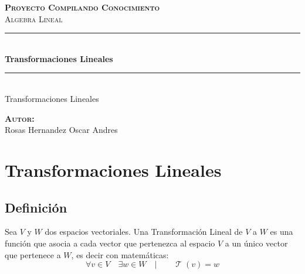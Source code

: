 \documentclass[12pt]{report}                                    %
\author{Oscar Andrés Rosas}                                     %
\DeclareMathOperator \LinealTransformation {\mathcal{T}}        %
\begin{document}
\begin{titlepage}

    \center
    \textbf{\textsc{\Large Proyecto Compilando Conocimiento}}\\[1.0cm] 
    \textsc{\Large Algebra Lineal}\\[1.0cm] 

    \rule{\linewidth}{0.5mm} \\[1.0cm]
        { \huge \bfseries Transformaciones Lineales}\\[1.0cm] 
    \rule{\linewidth}{0.5mm} \\[2.0cm]
    
    {\LARGE Transformaciones Lineales}\\[7cm] 
    
    \begin{center} \large
    \textbf{\textsc{Autor:}}\\
    Rosas Hernandez Oscar Andres
    \end{center}

    \vfill

\end{titlepage}


\tableofcontents{}
\label{sec:Index}


\clearpage

\chapter{Transformaciones Lineales}
    \clearpage

    \section{Definición}
        Sea $V$ y $W$ dos espacios vectoriales. Una Transformación Lineal de $V$ a $W$ es
        una función que asocia a cada vector que pertenezca al espacio $V$ a un único vector
        que pertenece a $W$, es decir con matemáticas:
        \begin{equation*}
            \forall v \in V \quad \exists w \in W \quad|\quad\quad \LinealTransformation(v) = w 
        \end{equation*}
\end{document}
